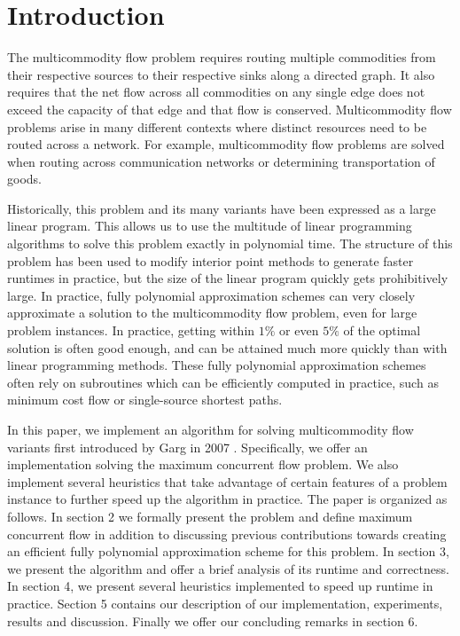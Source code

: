\section{Introduction}

The multicommodity flow problem requires routing multiple commodities
from their respective sources to their respective sinks along a
directed graph. It also requires that the net flow across all commodities on any
single edge does not exceed the capacity of that edge and that flow is conserved. Multicommodity
flow problems arise in many different contexts where distinct
resources need to be routed across a network. For example,
multicommodity flow problems are solved when routing across
communication networks or determining transportation of goods.

Historically, this problem and its many variants have been expressed as a
large linear program. This allows us to use the multitude of linear programming 
algorithms to solve this problem exactly in polynomial time. The
structure of this problem has been used to modify
interior point methods to generate faster runtimes in practice, but
the size of the linear program quickly gets prohibitively large. In
practice, fully polynomial approximation schemes can very closely
approximate a solution to the multicommodity flow problem, even for
large problem instances. In practice, getting within $1\%$ or even
$5\%$ of the optimal solution is often good enough, and can be
attained much more quickly than with linear
programming methods. These fully polynomial approximation schemes
often rely on subroutines which can be efficiently computed in
practice, such as minimum cost flow or single-source shortest paths.

In this paper, we implement an algorithm for solving multicommodity
flow variants first introduced by Garg in 2007 \cite{garg}. 
Specifically, we offer
an implementation solving the maximum concurrent flow problem. We also
implement several heuristics that take advantage of certain features
of a problem instance to further speed up the algorithm in
practice. The paper is organized as follows. In section 2
we formally present the problem and define maximum concurrent flow in
addition to discussing previous contributions towards creating an
efficient fully polynomial approximation scheme for this problem. In
section 3, we present the algorithm and offer a brief analysis of its
runtime and correctness. In section 4, we present several heuristics
implemented to speed up runtime in practice. Section 5 contains our
description of our implementation, experiments, results and
discussion.  Finally we offer our concluding remarks in section 6.

